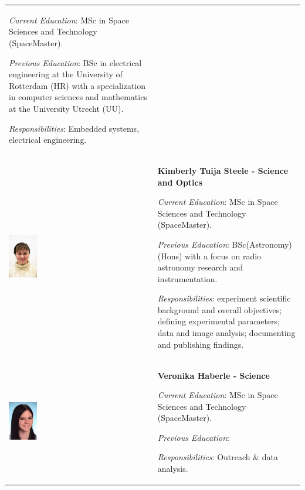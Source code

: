 \begin{longtable}[]{m{} m{}}
\smallskip
\textit{Current Education}: MSc in Space Sciences and Technology (SpaceMaster).

\smallskip
\textit{Previous Education}: BSc in electrical engineering at the University of Rotterdam (HR) with a specialization in computer sciences and mathematics at the University Utrecht (UU).

\smallskip
\textit{Responsibilities}: Embedded systems, electrical engineering.
\bigskip
\\

\includegraphics[width=0.2\textwidth]{0-cover/img/TEAMPICS/Kim_Final.jpg}  & \textbf{Kimberly Tuija Steele - Science and Optics}

\smallskip
\textit{Current Education}: MSc in Space Sciences and Technology (SpaceMaster).

\smallskip
\textit{Previous Education}: BSc(Astronomy)(Hons) with a focus on radio astronomy research and instrumentation.

\smallskip
\textit{Responsibilities}: experiment scientific background and overall objectives; defining experimental parameters; data and image analysis; documenting and publishing findings.

\bigskip
\\

\includegraphics[width=0.2\textwidth]{0-cover/img/TEAMPICS/Veronika.jpg}  & \textbf{Veronika Haberle - Science}

\smallskip
\textit{Current Education}: MSc in Space Sciences and Technology (SpaceMaster).

\smallskip
\textit{Previous Education}:

\smallskip
\textit{Responsibilities}: Outreach \& data analysis.
\bigskip
\\


\end{longtable}
